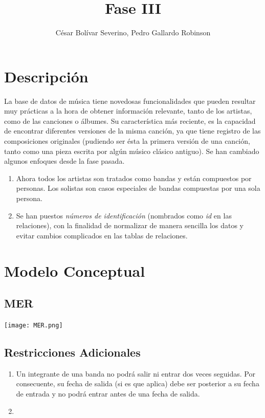 \documentclass[10pt,a4paper]{article}
\author{César Bolívar Severino, Pedro Gallardo Robinson} %
\title{Fase III}
\begin{document}
\maketitle

\section{Descripción}

La base de datos de música tiene novedosas funcionalidades que pueden resultar muy prácticas a la hora de obtener información relevante, tanto de los artistas, como de las canciones o álbumes.
Su característica más reciente, es la capacidad de encontrar diferentes versiones de la misma canción, ya que tiene registro de las composiciones originales (pudiendo ser ésta la primera versión de una canción, tanto como una pieza escrita por algún músico clásico antiguo).
\newline
Se han cambiado algunos enfoques desde la fase pasada.
\begin{enumerate}
	\item Ahora todos los artistas son tratados como bandas y están compuestos por personas. Los solistas son casos especiales de bandas compuestas por una sola persona.
	\item Se han puestos \textit{números de identificación} (nombrados como \textit{id} en las relaciones), con la finalidad de normalizar de manera sencilla los datos y evitar cambios complicados en las tablas de relaciones.
\end{enumerate}

\newpage

\section{Modelo Conceptual}

\subsection{MER}
\begin{center}
\texttt{[image: MER.png]}
\end{center}

\subsection{Restricciones Adicionales}
 \begin{enumerate}
 \item Un integrante de una banda no podrá salir ni entrar dos veces seguidas. Por consecuente, su fecha de salida  (si es que aplica) debe ser posterior a su fecha de entrada y no podrá entrar antes de una fecha de salida.
 \item
 \end{enumerate}
\newpage
\end{document}
